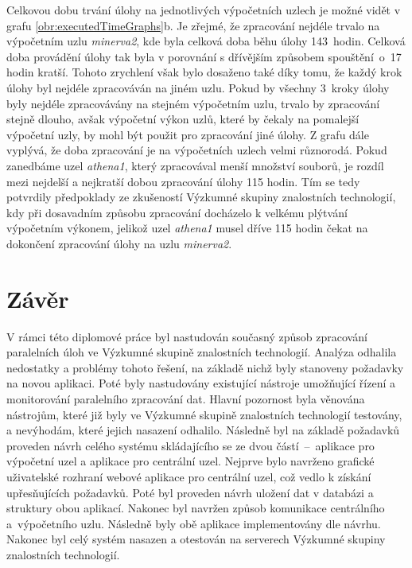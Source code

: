Celkovou dobu trvání úlohy na jednotlivých výpočetních uzlech je možné vidět v grafu \ref{obr:executedTimeGraphs}b. Je zřejmé, že zpracování nejdéle trvalo na výpočetním uzlu \textit{minerva2}, kde byla celková doba běhu úlohy 143~hodin. Celková doba provádění úlohy tak byla v porovnání s dřívějším způsobem spouštění~o~17 hodin kratší. Tohoto zrychlení však bylo dosaženo také díky tomu, že každý krok úlohy byl nejdéle zpracováván na jiném uzlu. Pokud by všechny 3~kroky úlohy byly nejdéle zpracovávány na stejném výpočetním uzlu, trvalo by zpracování stejně dlouho, avšak výpočetní výkon uzlů, které by čekaly na pomalejší výpočetní uzly, by mohl být použit pro zpracování jiné úlohy. Z grafu dále vyplývá, že doba zpracování je na výpočetních uzlech velmi různorodá. Pokud zanedbáme uzel \textit{athena1}, který zpracovával menší množství souborů, je rozdíl mezi nejdelší a nejkratší dobou zpracování úlohy 115 hodin. Tím se tedy potvrdily předpoklady ze zkušeností Výzkumné skupiny znalostních technologií, kdy při dosavadním způsobu zpracování docházelo k velkému plýtvání výpočetním výkonem, jelikož uzel \textit{athena1} musel dříve 115 hodin čekat na dokončení zpracování úlohy na uzlu \textit{minerva2}.


\chapter{Závěr}
\label{chapter:conclusion}

V rámci této diplomové práce byl nastudován současný způsob zpracování paralelních úloh ve Výzkumné skupině znalostních technologií. Analýza odhalila nedostatky a problémy tohoto řešení, na základě nichž byly stanoveny požadavky na novou aplikaci. Poté byly nastudovány existující nástroje umožňující řízení a monitorování paralelního zpracování dat. Hlavní pozornost byla věnována nástrojům, které již byly ve Výzkumné skupině znalostních technologií testovány, a nevýhodám, které jejich nasazení odhalilo. Následně byl na základě požadavků proveden návrh celého systému skládajícího se ze dvou částí~--~aplikace pro výpočetní uzel a aplikace pro centrální uzel. Nejprve bylo navrženo grafické uživatelské rozhraní webové aplikace pro centrální uzel, což vedlo k získání upřesňujících požadavků. Poté byl proveden návrh uložení dat v databázi a struktury obou aplikací. Nakonec byl navržen způsob komunikace centrálního a~výpočetního uzlu. Následně byly obě aplikace implementovány dle návrhu. Nakonec byl celý systém nasazen a otestován na serverech Výzkumné skupiny znalostních technologií. 

